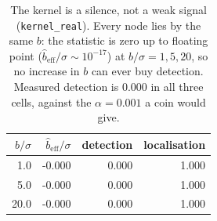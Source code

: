 \begin{table}[t]
\centering
\caption{The kernel is a silence, not a weak signal (\texttt{kernel\_real}). Every node lies by the same $b$: the statistic is zero up to floating point ($\hat b_{\text{eff}}/\sigma\sim10^{-17}$) at $b/\sigma=1,5,20$, so no increase in $b$ can ever buy detection. Measured detection is $0.000$ in all three cells, against the $\alpha=0.001$ a coin would give.}
\label{tab:kernel}
\small
\begin{tabular}{@{}r r r r@{}}
\toprule
$b/\sigma$ & $\hat b_{\text{eff}}/\sigma$ & detection & localisation \\
\midrule
1.0 & -0.000 & 0.000 & 1.000 \\
5.0 & -0.000 & 0.000 & 1.000 \\
20.0 & -0.000 & 0.000 & 1.000 \\
\bottomrule
\end{tabular}
\end{table}
